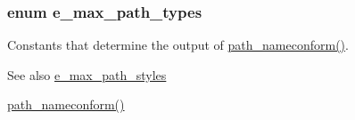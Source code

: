 \hypertarget{group__files_gac6a8a4db7a7de5fbc21188399713c7ee}{
\subsubsection[{e\_\-max\_\-path\_\-types}]{\setlength{\rightskip}{0pt plus 5cm}enum {\bf e\_\-max\_\-path\_\-types}}}
\label{group__files_gac6a8a4db7a7de5fbc21188399713c7ee}


Constants that determine the output of \hyperlink{group__files_gaaf014af82bc666cd974b83441eb4c9c6}{path\_\-nameconform()}. \begin{DoxySeeAlso}{See also}
\hyperlink{group__files_gaaf8f3fbe8b4ab0b73258a6b782461867}{e\_\-max\_\-path\_\-styles} 

\hyperlink{group__files_gaaf014af82bc666cd974b83441eb4c9c6}{path\_\-nameconform()} 
\end{DoxySeeAlso}
